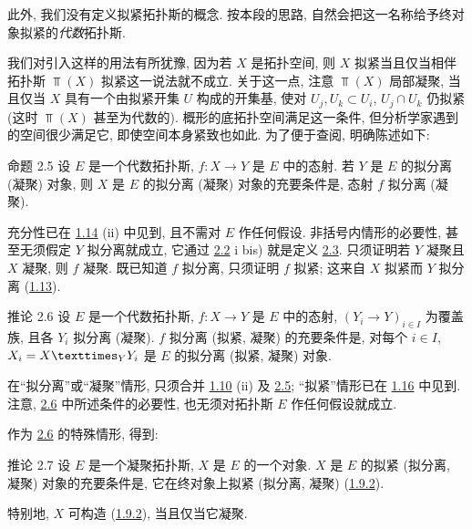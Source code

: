 此外, 我们没有定义拟紧拓扑斯的概念.
按本段的思路, 自然会把这一名称给予终对象拟紧的\emph{代数}拓扑斯.

我们\pageoriginale{}对引入这样的用法有所犹豫,
因为若 $X$ 是拓扑空间,
则 $X$ 拟紧当且仅当相伴拓扑斯 $\Top(X)$ 拟紧这一说法就不成立.
关于这一点, 注意 $\Top(X)$ 局部凝聚,
当且仅当 $X$ 具有一个由拟紧开集 $U$ 构成的开集基,
使对 $U_j,U_k\subset U_i$, $U_j\cap U_k$ 仍拟紧
(这时 $\Top(X)$ 甚至为代数的).
概形的底拓扑空间满足这一条件,
但分析学家遇到的空间很少满足它, 即使空间本身紧致也如此.
为了便于查阅, 明确陈述如下:

\begin{enonce*}{命题 2.5}
设 $E$ 是一个代数拓扑斯, $f:X\to Y$ 是 $E$ 中的态射.
若 $Y$ 是 $E$ 的拟分离 (\resp 凝聚) 对象,
则 $X$ 是 $E$ 的拟分离 (\resp 凝聚) 对象的充要条件是,
态射 $f$ 拟分离 (\resp 凝聚).
\end{enonce*}

充分性已在 \hyperref[VI.prop1.14]{1.14} (ii) 中见到,
且不需对 $E$ 作任何假设.
非括号内情形的必要性, 甚至无须假定 $Y$ 拟分离就成立,
它通过 \hyperref[VI.prop2.2]{2.2} i bis)
就是定义 \hyperref[VI.def2.3]{2.3}.
只须证明若 $Y$ 凝聚且 $X$ 凝聚, 则 $f$ 凝聚.
既已知道 $f$ 拟分离, 只须证明 $f$ 拟紧;
这来自 $X$ 拟紧而 $Y$ 拟分离
(\hyperref[VI.def1.13]{1.13}).

\begin{enonce*}{推论 2.6}
设\pageoriginale{} $E$ 是一个代数拓扑斯,
$f:X\to Y$ 是 $E$ 中的态射,
$(Y_i\to Y)_{i\in I}$ 为覆盖族,
且各 $Y_i$ 拟分离 (\resp 凝聚).
$f$ 拟分离 (\resp 拟紧, \resp 凝聚) 的充要条件是,
对每个 $i\in I$,
$X_i=\fprod{X}{Y_i}{Y}$ 是 $E$ 的拟分离
(\resp 拟紧, \resp 凝聚) 对象.
\end{enonce*}

在“拟分离”或“凝聚”情形,
只须合并 \hyperref[VI.prop1.10]{1.10} (ii)
及 \hyperref[VI.prop2.5]{2.5};
“拟紧”情形已在 \hyperref[VI.cor1.16]{1.16} 中见到.
注意, \hyperref[VI.cor2.6]{2.6} 中所述条件的必要性,
也无须对拓扑斯 $E$ 作任何假设就成立.

作为 \hyperref[VI.cor2.6]{2.6} 的特殊情形, 得到:

\begin{enonce*}{推论 2.7}
设 $E$ 是一个凝聚拓扑斯, $X$ 是 $E$ 的一个对象.
$X$ 是 $E$ 的拟紧 (\resp 拟分离, \resp 凝聚) 对象的充要条件是,
它在终对象上拟紧 (\resp 拟分离, \resp 凝聚)
(\hyperref[VI.subsubsec1.9.2]{1.9.2}).
\end{enonce*}

特别地, $X$ 可构造 (\hyperref[VI.subsubsec1.9.2]{1.9.2}),
当且仅当它凝聚.


